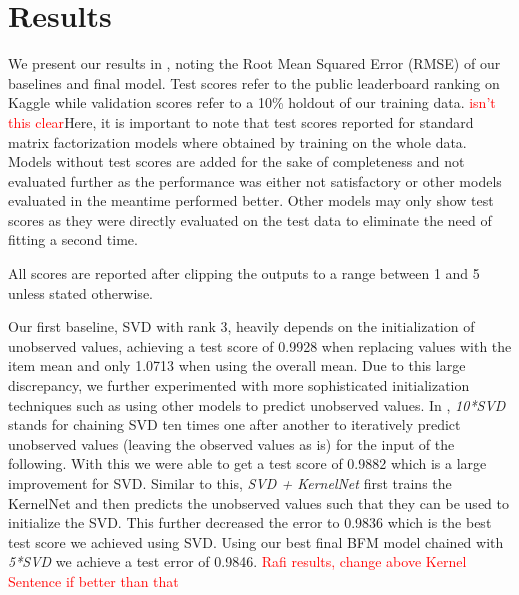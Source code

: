 \documentclass[10pt,conference,compsocconf]{IEEEtran}
\newcommand{\todo}[1]{\textcolor{red}{#1}}
\begin{document}
    \section{Results}
    We present our results in , noting the Root Mean Squared Error (RMSE) of our baselines and final model.
    Test scores refer to the public leaderboard ranking on Kaggle while validation scores refer to a 10\% holdout of our training data.
    \todo{isn't this clear}Here, it is important to note that test scores reported for standard matrix factorization models where obtained by training on the whole data.
    Models without test scores are added for the sake of completeness and not evaluated further as the performance was either not satisfactory or other models evaluated in the meantime performed better.
    Other models may only show test scores as they were directly evaluated on the test data to eliminate the need of
    fitting a second time.

    All scores are reported after clipping the outputs to a range between 1 and 5 unless stated otherwise.%

    Our first baseline, SVD with rank 3, heavily depends on the initialization of unobserved values, achieving a test score of 0.9928 when replacing values with the item mean and only 1.0713 when using the overall mean.
    Due to this large discrepancy, we further experimented with more sophisticated initialization techniques such as using other models to predict unobserved values.
    In , \textit{10*SVD} stands for chaining SVD ten times one after another to iteratively predict unobserved values (leaving the observed values as is) for the input of the following.
    With this we were able to get a test score of 0.9882 which is a large improvement for SVD.
    Similar to this, \textit{SVD + KernelNet} first trains the KernelNet and then predicts the unobserved values such that they can be used to initialize the SVD.
    This further decreased the error to 0.9836 which is the best test score we achieved using SVD.
    Using our best final BFM model chained with \textit{5*SVD} we achieve a test error of 0.9846.
    \todo{Rafi results, change above Kernel Sentence if better than that}
\end{document}
